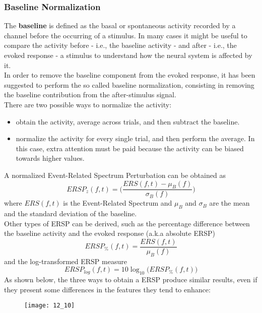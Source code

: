 \subsubsection{Baseline Normalization}
The \textbf{baseline} is defined as the basal or spontaneous
activity recorded by a channel before the occurring of a stimulus. In many cases it might
be useful to compare the activity before - i.e., the baseline activity - and after - i.e., the
evoked response - a stimulus to understand how the neural system is affected by it.\\
In order to remove the baseline component from the evoked response, it has been suggested to
perform the so called baseline normalization, consisting in removing the baseline contribution
from the after-stimulus signal.\\
There are two possible ways to normalize the activity:
\begin{itemize}
    \item obtain the activity, average across trials, and then subtract the baseline.
    \item normalize the activity for every single trial, and then perform the average.
          In this case, extra attention must be paid because the activity can be biased towards
          higher values.
\end{itemize}
A normalized Event-Related Spectrum Perturbation can be
obtained as
\begin{equation*}
    ERSP_z(f,t)=\biggl(\frac{ERS(f,t)-\mu_B(f)}{\sigma_B(f)}\biggr)
\end{equation*}
where \(ERS(f,t)\) is the Event-Related Spectrum and \(\mu_B\) and \(\sigma_B\) are the mean and the
standard deviation of the baseline.\\
Other types of ERSP can be derived, such as the percentage difference between the baseline
activity and the evoked response (a.k.a absolute ERSP)
\begin{equation*}
    ERSP_{\%}(f,t)=\frac{ERS(f,t)}{\mu_{B}(f)}
\end{equation*}
and the log-transformed ERSP measure
\begin{equation*}
    ERSP_{log}(f,t)=10\log_{10}\bigl(ERSP_{\%}(f,t)\bigr)
\end{equation*}
As shown below, the three ways to obtain a ERSP produce similar results, even if they
present some differences in the features they tend to enhance:
\begin{figure}[H]
    \centering
    \texttt{[image: 12\_10]}
\end{figure}
